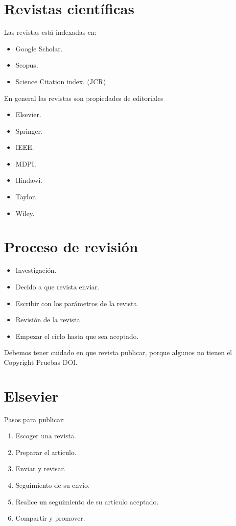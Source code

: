 \section{Revistas científicas}

Las revistas está indexadas en:
\begin{itemize}
	\item Google Scholar.
	\item Scopus.
	\item Science Citation index. (JCR) 
\end{itemize}

En general las revistas son propiedades de editoriales
\begin{itemize}
    \item Elsevier.
    \item Springer.
    \item IEEE.
    \item MDPI.
    \item Hindawi.
    \item Taylor.
    \item Wiley.
\end{itemize}

\section{Proceso de revisión}
\begin{itemize}
    \item Investigación.
    \item Decido a que revista enviar.
    \item Escribir con los parámetros de la revista.
    \item Revisión de la revista.
    \item Empezar el ciclo hasta que sea aceptado.
\end{itemize}

Debemos tener cuidado en que revista publicar, porque algunos no tienen el Copyright Pruebas DOI.

\section{Elsevier}

Pasos para publicar:

\begin{enumerate}[1.]
    \item Escoger una revista.
    \item Preparar el artículo.
    \item Enviar y revisar.
    \item Seguimiento de su envío.
    \item Realice un seguimiento de su artículo aceptado.
    \item Compartir y promover.
\end{enumerate}

